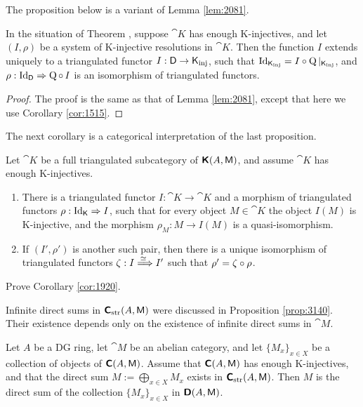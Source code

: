 The proposition below is a variant of Lemma \ref{lem:2081}.

\begin{prop} \label{prop:1510}
In the situation of Theorem \tup{\ref{thm:3135}}, suppose $\cat{K}$ has enough 
K-injectives, and let $(I, \rho)$ be a system of K-injective resolutions in 
$\cat{K}$. Then the function $I$ extends uniquely to a triangulated functor
$I : \operatorname{\mathsf{D}} \to \operatorname{\mathsf{K}}_{\mathrm{inj}}$, such that 
$\operatorname{Id}_{\operatorname{\mathsf{K}}_{\mathrm{inj}}} = I \circ \operatorname{Q}|_{\operatorname{\mathsf{K}}_{\mathrm{inj}}}$, 
and 
$\rho : \operatorname{Id}_{\operatorname{\mathsf{D}}} \Rightarrow \operatorname{Q} \circ \, I$
is an isomorphism of triangulated functors.
\end{prop}

\begin{proof}
The proof is the same as that of Lemma \ref{lem:2081}, 
except that here we use Corollary \ref{cor:1515}. 
\end{proof}

The next corollary is a categorical interpretation of the last proposition.

\begin{cor} \label{cor:1920}
Let $\cat{K}$ be a full triangulated subcategory of 
$\boldsymbol{\mathsf{K}}(A, \operatorname{\mathsf{M}})$, and assume $\cat{K}$ has enough K-injectives.
\begin{enumerate}
\item There is a triangulated functor 
$I : \cat{K} \to \cat{K}$ and a morphism of triangulated functors 
$\rho : \operatorname{Id}_{\operatorname{\mathsf{K}}} \Rightarrow I$, such that for every object $M \in \cat{K}$
the object $I(M)$ is K-injective, and the morphism 
$\rho_M : M \to I(M)$ is a quasi-isomorphism. 

\item If $(I', \rho')$ is another such pair, then there is a unique isomorphism 
of triangulated functors $\zeta : I \stackrel{\simeq\ }{\Longrightarrow} I'$ such that 
$\rho' = \zeta \circ \rho$. 
\end{enumerate}
\end{cor}

\begin{exer} \label{exer:1920}
Prove Corollary \ref{cor:1920}.
\end{exer}

Infinite direct sums in $\boldsymbol{\mathsf{C}}_{\mathrm{str}}(A, \operatorname{\mathsf{M}})$ were discussed in 
Proposition \ref{prop:3140}. Their existence depends only on the existence of 
infinite direct sums in $\cat{M}$. 

\begin{thm} \label{thm:3140}
Let $A$ be a DG ring, let $\cat{M}$ be an abelian category, and let 
$\{ M_x \}_{x \in X}$ be a collection of objects of 
$\boldsymbol{\mathsf{C}}(A, \operatorname{\mathsf{M}})$. Assume that $\boldsymbol{\mathsf{C}}(A, \operatorname{\mathsf{M}})$ has enough 
K-injectives, and that the direct sum 
$M := \bigoplus_{x \in X} M_x$
exists in $\boldsymbol{\mathsf{C}}_{\mathrm{str}}(A, \operatorname{\mathsf{M}})$. 
Then $M$ is the direct sum of the collection $\{ M_x \}_{x \in X}$ in 
$\boldsymbol{\mathsf{D}}(A, \operatorname{\mathsf{M}})$. 
\end{thm}

